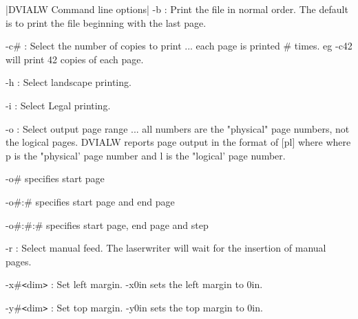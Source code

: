 \beginblockmode
\@|DVIALW Command line options|
\nbr
\endblockmode
\bl 
\li -b  : Print the file in normal order. The default is to print the file
      beginning with the last page.

\li -c\# : Select the number of copies to print ... each page is printed
      \# times. eg -c42 will print 42 copies of each page.

\li -h  : Select landscape printing.

\li -i  : Select Legal printing.

\li -o  : Select output page range ... all numbers are the "physical" page
      numbers, not the logical pages. DVIALW reports page output in the
      format of [p{l}] where where p is the "physical' page number and 
      l is the "logical' page number. 

        -o\#      specifies start page

        -o\#:\#    specifies start page and end page

        -o\#:\#:\#  specifies start page, end page and step

\li -r  : Select manual feed. The laserwriter will wait for the insertion of
      manual pages.

\li -x\#{\tt <}dim{\tt >} : Set left margin. -x0in sets the left margin to 0in.

\li -y\#{\tt <}dim{\tt >} : Set top margin. -y0in sets the top margin to 0in.
\el
\ejectpage
\marginnotesfalse
\done 

